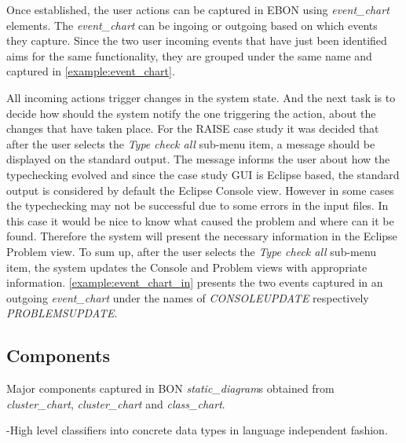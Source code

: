 \documentclass[conference]{IEEEtran}
\begin{document}


Once established, the user actions can be captured in EBON using
\emph{event\_chart} elements. The \emph{event\_chart} can be ingoing
or outgoing based on which events they capture. Since the two user
incoming events that have just been identified aims for the same
functionality, they are grouped under the same name and captured in
\autoref{example:event_chart}.




All incoming actions trigger changes in the system state. And the
next task is to decide how should the system notify the one triggering the
action, about the changes that have taken place. For the RAISE case
study it was decided that after the user selects the \emph{Type check
all} sub-menu item, a message should be displayed on the standard output.
The message informs the user about how the typechecking evolved and
since the case study GUI is Eclipse based, the standard output is considered by
default the Eclipse Console view. However in some cases the
typechecking may not be successful due to some errors in the input
files. In this case it would be nice to know what caused the problem
and where can it be found. Therefore the system will present the
necessary information in the Eclipse Problem view. To sum up, after the
user selects the \emph{Type check all} sub-menu item, the system updates the
Console and Problem views with appropriate information.
\autoref{example:event_chart_in} presents the two events captured in
an outgoing \emph{event\_chart} under the names of
\emph{CONSOLEUPDATE} respectively \emph{PROBLEMSUPDATE}.


%
\subsection{Components}
\label{sec:components}

Major components captured in BON \emph{static\_diagram}s obtained from
\emph{cluster\_chart}, \emph{cluster\_chart} and \emph{class\_chart}.

-High level classifiers into concrete data types in language
independent fashion.
\end{document}
